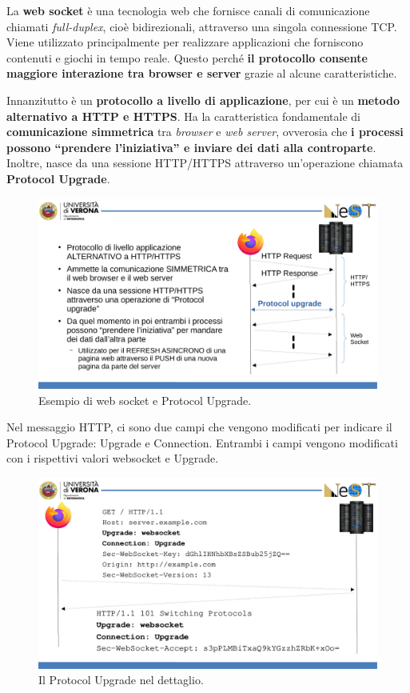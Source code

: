 \documentclass[a4paper]{article}
\newcommand{\dquotes}[1]{``#1''}
\begin{document}
	La \textcolor{Red3}{\textbf{web socket}} è una tecnologia web che fornisce canali di comunicazione chiamati \emph{full-duplex}, cioè bidirezionali, attraverso una singola connessione TCP. Viene utilizzato principalmente per realizzare applicazioni che forniscono contenuti e giochi in tempo reale. Questo perché \textbf{il protocollo consente maggiore interazione tra browser e server} grazie al alcune caratteristiche.\newline
	
	\noindent
	Innanzitutto è un \textbf{protocollo a livello di applicazione}, per cui è un \textbf{metodo alternativo a HTTP e HTTPS}. Ha la caratteristica fondamentale di \textbf{comunicazione simmetrica} tra \emph{browser} e \emph{web server}, ovverosia che \textbf{i processi possono \dquotes{prendere l'iniziativa} e inviare dei dati alla controparte}. Inoltre, nasce da una sessione HTTP/HTTPS attraverso un'operazione chiamata \textbf{Protocol Upgrade}.
	\begin{figure}[!htp]
		\centering
		\includegraphics[width=.5\textwidth]{img/web_socket.pdf}
		\caption{Esempio di web socket e Protocol Upgrade.}
	\end{figure}
	
	\noindent
	Nel messaggio HTTP, ci sono due campi che vengono modificati per indicare il Protocol Upgrade: \textsf{Upgrade} e \textsf{Connection}. Entrambi i campi vengono modificati con i rispettivi valori \textsf{websocket} e \textsf{Upgrade}.\newpage
	
	\noindent
	\begin{figure}[!htp]
		\centering
		\includegraphics[width=\textwidth]{img/protocol_upgrade.pdf}
		\caption{Il Protocol Upgrade nel dettaglio.}
	\end{figure}\newpage
\end{document}
